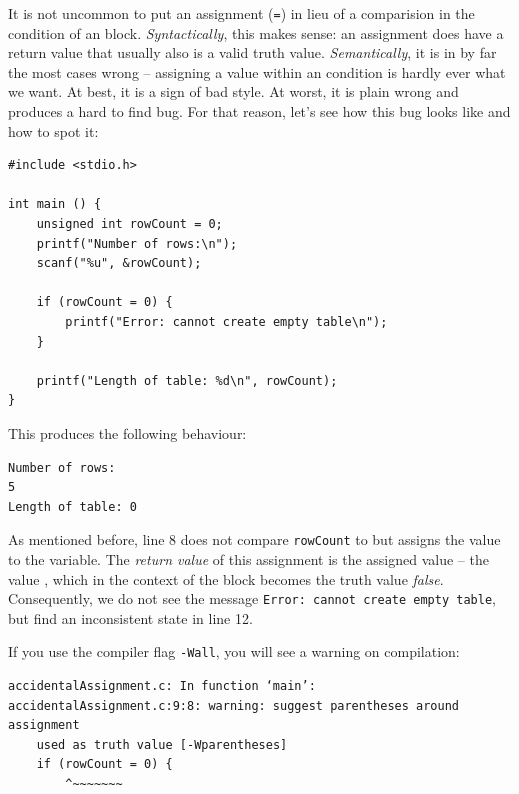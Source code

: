 \begin{warnbox}[Common mistake: Comparison operator \texttt{==} vs. assignment operator \texttt{=}]
It is not uncommon to put an assignment (\texttt{=}) in lieu of a comparision in the condition of an  block. \emph{Syntactically}, this makes sense: an assignment does have a return value that usually also is a valid truth value. \emph{Semantically}, it is in by far the most cases wrong -- assigning a value within an  condition is hardly ever what we want. At best, it is a sign of bad style. At worst, it is plain wrong and produces a hard to find bug. For that reason, let's see how this bug looks like and how to spot it:

\begin{warnbox}[accidentalAssignment.c, leftupper=7mm]
\begin{verbatim}
#include <stdio.h>

int main () {
    unsigned int rowCount = 0;
    printf("Number of rows:\n");
    scanf("%u", &rowCount);

    if (rowCount = 0) {
        printf("Error: cannot create empty table\n");
    }

    printf("Length of table: %d\n", rowCount);
}
\end{verbatim}
\end{warnbox}

This produces the following behaviour:

\begin{cmdbox}
\begin{verbatim}
Number of rows:
5
Length of table: 0
\end{verbatim}
\end{cmdbox}

As mentioned before, line 8 does not compare \texttt{rowCount} to  but assigns the value to the variable. The \emph{return value} of this assignment is the assigned value -- \ie the value , which in the context of the  block becomes the truth value \emph{false}. Consequently, we do not see the message \texttt{Error: cannot create empty table}, but find an inconsistent state in line 12.

If you use the compiler flag \texttt{-Wall}, you will see a warning on compilation:

\begin{cmdbox}
\begin{verbatim}
accidentalAssignment.c: In function ‘main’:
accidentalAssignment.c:9:8: warning: suggest parentheses around assignment 
    used as truth value [-Wparentheses]
    if (rowCount = 0) {
        ^~~~~~~~
\end{verbatim}
\end{cmdbox}
\end{warnbox}

